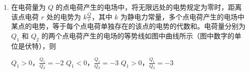 \documentclass[\gkver]{gaokaozhenti}
\begin{document}
\begin{enumerate}
{$mg\cos\theta = m\frac{v^{2}}{R}$

联立解得 $\cos\theta = \frac{2}{3}$

从大圆环顶端到 P 点过程，小环速度较小，小环重力沿着大圆环圆心方向的分力大于小环所需的向心力，所以大圆环对小环的弹力背离圆心，不断减小，从 P 点到最低点过程，小环速度变大，小环重力和大圆环对小环的弹力合力提供向心力，所以大圆环对小环的弹力逐渐变大，根据牛顿第三定律可知小环下滑过程中对大圆环的作用力大小先减小后增大。

方法二（数学法）：设大圆环半径为 $R$，小环在大圆环上某处时，设该处与圆心的连线与竖直向上的夹角为 $\theta$（$0 \leq \theta \leq \pi$），根据机械能守恒定律

$mgR(1 - \cos\theta) = \frac{1}{2}mv^{2}$（$0 \leq \theta \leq \pi$）

在该处根据牛顿第二定律

$F + mg\cos\theta = m\frac{v^{2}}{R}$（$0 \leq \theta \leq \pi$）

联立可得

$F = 2mg - 3mg\cos\theta$

则大圆环对小环作用力的大小

$|F| = |2mg - 3mg\cos\theta|$

根据数学知识可知 $|F|$ 的大小在 $\cos\theta = \frac{2}{3}$ 时最小，结合牛顿第三定律可知小环下滑过程中对大圆环的作用力大小先减小后增大。

故选 C。
}

\item
在电荷量为 $Q$ 的点电荷产生的电场中，将无限远处的电势规定为零时，距离该点电荷 $r$ 处的电势为 $k\frac{Q}{r}$，其中 $k$ 为静电力常量，多个点电荷产生的电场中某点的电势，等于每个点电荷单独存在的该点的电势的代数和。电荷量分别为 $Q_{1}$ 和 $Q_{2}$ 的两个点电荷产生的电场的等势线如图中曲线所示（图中数字的单位是伏特），则


{$Q_{1} > 0$，$\frac{Q_{1}}{Q_{2}} = -2$}
{$Q_{1} < 0$，$\frac{Q_{1}}{Q_{2}} = -3$}
{$Q_{1} > 0$，$\frac{Q_{1}}{Q_{2}} = -3$}

\end{enumerate}
\end{document}
